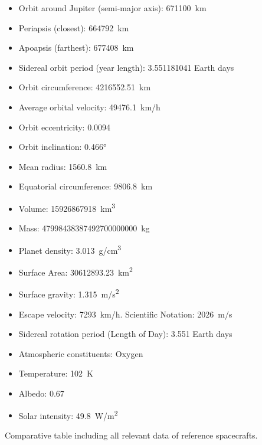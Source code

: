\begin{itemize}
\item{Orbit around Jupiter (semi-major axis):} \SI{671100}{km}
\item{Periapsis (closest):} \SI{664792}{km}
\item{Apoapsis (farthest):} \SI{677408}{km}
\item{Sidereal orbit period (year length):} 3.551181041 Earth days
\item{Orbit circumference:} \SI{4216552.51}{km}
\item{Average orbital velocity:} \SI{49476.1}{km/h}
\item{Orbit eccentricity:} 0.0094
\item{Orbit inclination:} \ang{0.466}
\item{Mean radius:} \SI{1560.8}{km}
\item{Equatorial circumference:} \SI{9806.8}{km}
\item{Volume:} \SI{15926867918}{km^3}
\item{Mass:} \SI{47998438387492700000000}{kg}
\item{Planet density:} \SI{3.013}{g/cm^3}
\item{Surface Area:} \SI{30612893.23}{km^2}
\item{Surface gravity:} \SI{1.315}{m/s^2}
\item{Escape velocity:} \SI{7293}{km/h}. Scientific Notation: \SI{2026}{m/s}
\item{Sidereal rotation period (Length of Day):} 3.551 Earth days
\item{Atmospheric constituents:} Oxygen
\item{Temperature:} \SI{102}{K}
\item{Albedo:} 0.67
\item{Solar intensity:} \SI{49.8}{W/m^2}
\end{itemize}



Comparative table including all relevant data of reference
spacecrafts.

